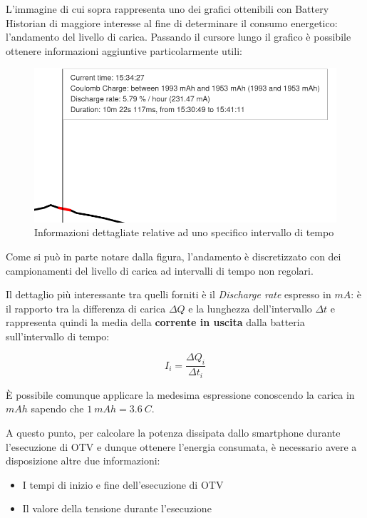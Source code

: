 L'immagine di cui sopra rappresenta uno dei grafici ottenibili con Battery Historian di maggiore interesse al fine di
determinare il consumo energetico: l'andamento del livello di carica. Passando il cursore lungo il grafico è possibile
ottenere informazioni aggiuntive particolarmente utili:

\begin{figure}[h!]
    \begin{center}
        \includegraphics[scale=0.5]{img/battery_historian_hover.png}
        \caption{Informazioni dettagliate relative ad uno specifico intervallo di tempo}
    \end{center}
\end{figure}

Come si può in parte notare dalla figura, l'andamento è discretizzato con dei campionamenti del livello di carica ad 
intervalli di tempo non regolari.

Il dettaglio più interessante tra quelli forniti è il \textit{Discharge rate} espresso in $mA$: è il rapporto tra la differenza
di carica $\Delta Q$ e la lunghezza dell'intervallo $\Delta t$ e rappresenta quindi la media della \textbf{corrente in uscita} 
dalla batteria sull'intervallo di tempo:

\begin{equation*}
    I_{i} = \frac{\Delta Q_i}{\Delta t_i}
\end{equation*}

È possibile comunque applicare la medesima espressione conoscendo la carica in $mAh$ sapendo che $1~mAh = 3.6~C$.

A questo punto, per calcolare la potenza dissipata dallo smartphone durante l'esecuzione di OTV e dunque ottenere l'energia 
consumata, è necessario avere a disposizione altre due informazioni:
\begin{itemize}
    \item I tempi di inizio e fine dell'esecuzione di OTV
    \item Il valore della tensione durante l'esecuzione
\end{itemize}


